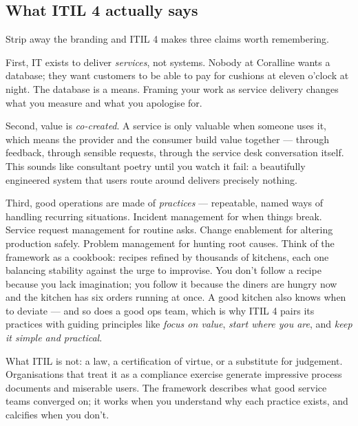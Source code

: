 \subsection{What ITIL 4 actually says}


Strip away the branding and ITIL 4 makes three claims worth remembering.


First, IT exists to deliver \emph{services}, not systems. Nobody at Coralline wants a database; they want customers to be able to pay for cushions at eleven o'clock at night. The database is a means. Framing your work as service delivery changes what you measure and what you apologise for.


Second, value is \emph{co-created}. A service is only valuable when someone uses it, which means the provider and the consumer build value together — through feedback, through sensible requests, through the service desk conversation itself. This sounds like consultant poetry until you watch it fail: a beautifully engineered system that users route around delivers precisely nothing.


Third, good operations are made of \emph{practices} — repeatable, named ways of handling recurring situations. Incident management for when things break. Service request management for routine asks. Change enablement for altering production safely. Problem management for hunting root causes. Think of the framework as a cookbook: recipes refined by thousands of kitchens, each one balancing stability against the urge to improvise. You don't follow a recipe because you lack imagination; you follow it because the diners are hungry now and the kitchen has six orders running at once. A good kitchen also knows when to deviate — and so does a good ops team, which is why ITIL 4 pairs its practices with guiding principles like \emph{focus on value}, \emph{start where you are}, and \emph{keep it simple and practical}.


What ITIL is not: a law, a certification of virtue, or a substitute for judgement. Organisations that treat it as a compliance exercise generate impressive process documents and miserable users. The framework describes what good service teams converged on; it works when you understand why each practice exists, and calcifies when you don't.




